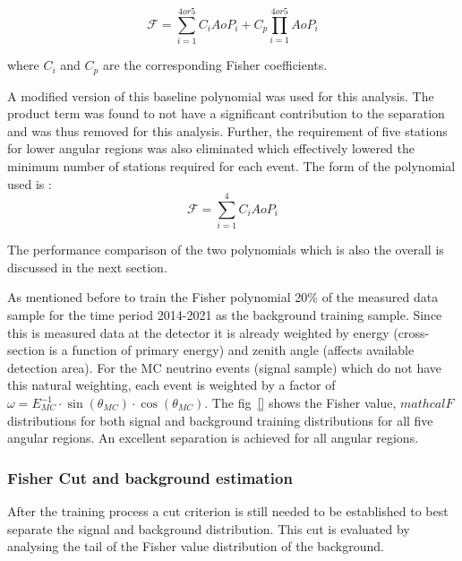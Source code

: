 \begin{equation}
  \mathcal{F} = \sum_{i=1}^{4or5} C_i AoP_i + C_p \prod_{i=1}^{4or5} AoP_i
\end{equation}

where $C_i$ and $C_p$ are the corresponding Fisher coefficients. 

A modified version of this baseline polynomial was used for this analysis. The product term was found to not have a significant contribution to the separation and was thus removed for this analysis. Further, the requirement of five stations for lower angular regions was also eliminated which effectively lowered the minimum number of stations required for each event. The form of the polynomial used is : 
\begin{equation}
  \label{eq:fisher_poly_new}
  \mathcal{F} = \sum_{i=1}^{4} C_i AoP_i
\end{equation}

The performance comparison of the two polynomials which is also the overall is discussed in the next section.

As mentioned before to train the Fisher polynomial 20\% of the measured data sample for the time period 2014-2021 as the background training sample. Since this is measured data at the detector it is already weighted by energy (cross-section is a function of primary energy) and zenith angle (affects available detection area). For the MC neutrino events (signal sample) which do not have this natural weighting, each event is weighted by a factor of $\omega = E_{MC}^{-1} \cdot \sin(\theta_{MC}) \cdot \cos(\theta_{MC})$. The fig~\ref{} shows the Fisher value, $mathcal{F}$ distributions for both signal and background training distributions for all five angular regions. An excellent separation is achieved for all angular regions. 

\subsubsection{Fisher Cut and background estimation}
\label{subsubsec:nu_sel_fisher_cut}
After the training process a cut criterion is still needed to be established to best separate the signal and background distribution. This cut is evaluated by analysing the tail of the Fisher value distribution of the background. 

